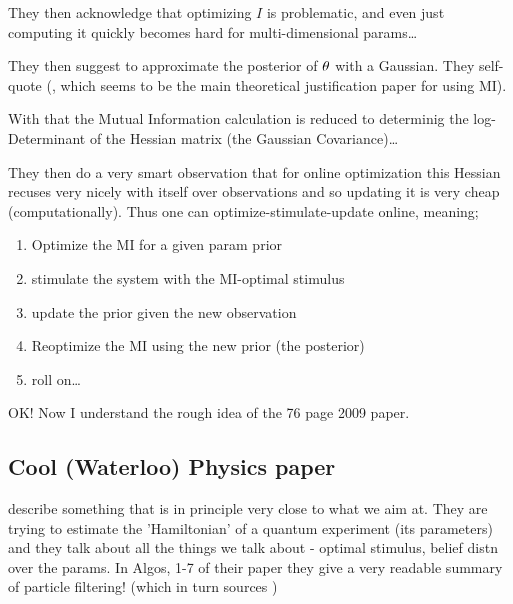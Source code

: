 \documentclass{article}
\begin{document}
They then acknowledge that optimizing $I$ is problematic, and even just
computing it quickly becomes hard for multi-dimensional params\ldots

They then suggest to approximate the posterior of ${\theta}$ with a Gaussian. They
self-quote (\cite{Paninski2005}, which seems to be the main theoretical
justification paper for using MI).

With that the Mutual Information calculation is reduced to determinig the
log-Determinant of the Hessian matrix (the Gaussian Covariance)\ldots

They then do a very smart observation that for online optimization this Hessian
recuses very nicely with itself over observations and so updating it is very
cheap (computationally). Thus one can optimize-stimulate-update online, meaning;

\begin{enumerate}
  \item Optimize the MI for a given param prior
  \item stimulate the system with the MI-optimal stimulus
  \item update the prior given the new observation
  \item Reoptimize the MI using the new prior (the posterior)
  \item roll on\ldots
\end{enumerate}

OK! Now I understand the rough idea of the 76 page 2009 paper\cite{Lewi2009}.

\subsection{Cool (Waterloo) Physics paper}
\cite{Granade2012} describe something that is in principle very close to what we
aim at. They are trying to estimate the 'Hamiltonian' of a quantum experiment
(its parameters) and they talk about all the things we talk about - optimal
stimulus, belief distn over the params. In Algos, 1-7 of their paper they give a
very readable summary of particle filtering! (which in turn sources
\cite{Liu2001})



\end{document}
